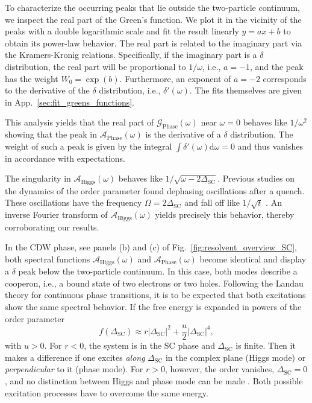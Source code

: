 \documentclass[
    reprint, 
    aps,
    preprintnumbers,
    twocolumn,
    prb,
    superscriptaddress
]{revtex4-2}
\newcommand{\greens}[1]{\mathcal{G}_\text{#1} (\omega)}
\newcommand{\spectral}[1]{\mathcal{A}_\text{#1}  (\omega)}
\begin{document}
To characterize the occurring peaks that lie outside the two-particle continuum, we inspect the real part of the Green's function.
We plot it in the vicinity of the peaks with a double logarithmic scale and fit 
the result linearly $y = ax + b$ to obtain its power-law behavior.
The real part is related to the imaginary part via the Kramers-Kronig relations.
Specifically, if the imaginary part is a $\delta$ distribution, the real part will be proportional to $1/\omega$, i.e., $a=-1$, and the peak has the weight $W_0 = \exp(b)$.
Furthermore, an exponent of $a=-2$ corresponds to the 
derivative of the $\delta$ distribution, i.e., $\delta'(\omega)$.
The fits themselves are given in App.\ \ref{sec:fit_greens_functions}.

This analysis yields that the real part of $\greens{Phase}$ near $\omega=0$ behaves like
$1/\omega^2$ showing that the peak in $\spectral{Phase}$ is the derivative of a $\delta$ distribution.
The weight of such a peak is given by the integral $\int \delta'(\omega) \mathrm{d}\omega = 0$ and thus
vanishes in accordance with expectations.

The singularity in $\spectral{Higgs}$ behaves like $1/\sqrt{\omega - 2 \Delta_\text{SC}}$.
Previous studies on the dynamics of the order parameter found dephasing oscillations after a quench.
These oscillations have the frequency $\Omega = 2 \Delta_\text{SC}$ and fall off like
$1/\sqrt{t}$ \cite{Volkov73,Kulik1981,Yuzbashyan06}.
An inverse Fourier transform of $\spectral{Higgs}$ yields precisely this behavior, 
thereby corroborating our results.

In the CDW phase, see panels (b) and (c) of Fig.\ \ref{fig:resolvent_overview_SC},
both spectral functions $\spectral{Higgs}$ and $\spectral{Phase}$ become identical and display a $\delta$ peak below the two-particle continuum.
In this case, both modes describe a cooperon, i.e., a bound state of two electrons or two holes.
Following the Landau theory for continuous phase transitions, it is to be expected 
that both excitations show the same spectral behavior. 
If the free energy is expanded in powers of the order parameter 
\begin{equation}
    f(\Delta_\text{SC}) \approx r |\Delta_\text{SC}|^2 + \frac{u}{2} |\Delta_\text{SC}|^4,
\end{equation}
with  $u > 0$. For $r<0$, the system is in the SC phase and $\Delta_\text{SC}$ is finite.
Then it makes a difference if one excites \emph{along} $\Delta_\text{SC}$ in the complex plane (Higgs mode)
or \emph{perpendicular} to it (phase mode). For $r>0$, however, the order vanishes, $\Delta_\text{SC}=0$,
and no distinction between Higgs and phase mode can be made \cite{Coleman2015}. 
Both possible excitation processes have to overcome the same energy. 
\end{document}
